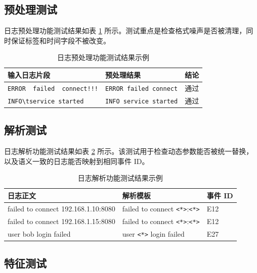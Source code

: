 \subsection{预处理测试}

日志预处理功能测试结果如表 \ref{tab:preprocess_test_result_revised} 所示。测试重点是检查格式噪声是否被清理，同时保证标签和时间字段不被改变。

\begin{table}[htbp]
    \centering
    \caption{日志预处理功能测试结果示例}
    \label{tab:preprocess_test_result_revised}
    \begin{tabular}{p{5cm}p{5cm}p{2cm}}
        \hline
        \textbf{输入日志片段} & \textbf{预处理结果} & \textbf{结论} \\
        \hline
        \texttt{ERROR\ \ failed\ \ connect!!!} & \texttt{ERROR failed connect} & 通过 \\
        \texttt{INFO\textbackslash tservice started} & \texttt{INFO service started} & 通过 \\
        \hline
    \end{tabular}
\end{table}

\subsection{解析测试}

日志解析功能测试结果如表 \ref{tab:parse_test_result_revised} 所示。该测试用于检查动态参数能否被统一替换，以及语义一致的日志能否映射到相同事件 ID。

\begin{table}[htbp]
    \centering
    \caption{日志解析功能测试结果示例}
    \label{tab:parse_test_result_revised}
    \begin{tabular}{p{5cm}p{4.5cm}p{2cm}}
        \hline
        \textbf{日志正文} & \textbf{解析模板} & \textbf{事件 ID} \\
        \hline
        failed to connect 192.168.1.10:8080 & failed to connect \texttt{<*>}:\texttt{<*>} & E12 \\
        failed to connect 192.168.1.15:8080 & failed to connect \texttt{<*>}:\texttt{<*>} & E12 \\
        user bob login failed & user \texttt{<*>} login failed & E27 \\
        \hline
    \end{tabular}
\end{table}

\subsection{特征测试}

